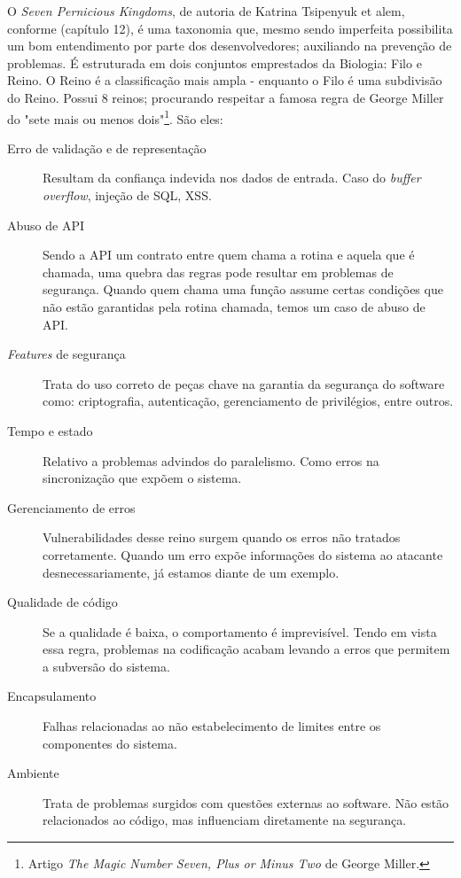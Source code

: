 			
			O \textsl{Seven Pernicious Kingdoms}, de autoria de Katrina Tsipenyuk et alem, conforme
			\cite{McGraw2006}(capítulo 12), é uma taxonomia que, mesmo sendo imperfeita possibilita
			um bom entendimento por parte dos desenvolvedores; auxiliando na prevenção de problemas.
			É estruturada em dois conjuntos emprestados da Biologia: Filo e Reino.
			O Reino é a classificação mais ampla - enquanto o Filo é uma subdivisão do Reino.
			Possui 8 reinos; procurando respeitar a famosa regra de George Miller 
			do "sete mais ou menos dois"\footnote{Artigo 
			\textsl{The Magic Number Seven, Plus or Minus Two} de George Miller.}. São eles:
			\begin{description}
				\item[Erro de validação e de representação]{Resultam da confiança
					indevida nos dados de entrada. Caso do \textsl{buffer overflow},
					injeção de SQL, XSS.}
				\item[Abuso de API]{Sendo a API um contrato entre quem chama a rotina
					e aquela que é chamada, uma quebra das regras pode resultar em problemas de segurança.
					Quando quem chama uma função assume certas condições que não estão garantidas
					pela rotina chamada, temos um caso de abuso de API.}
				\item[\textsl{Features} de segurança]{Trata do uso correto de peças chave na
					garantia da segurança do software como: criptografia, autenticação, gerenciamento
					de privilégios, entre outros.}
				\item[Tempo e estado]{Relativo a problemas advindos do paralelismo. Como erros
					na sincronização que expõem o sistema.}
				\item[Gerenciamento de erros]{Vulnerabilidades desse reino surgem quando
					os erros não tratados corretamente. Quando um erro expõe informações
					do sistema ao atacante desnecessariamente, já estamos diante de um exemplo.}
				\item[Qualidade de código]{Se a qualidade é baixa, o comportamento é imprevisível.
					Tendo em vista essa regra, problemas na codificação acabam levando
					a erros que permitem a subversão do sistema.}
				\item[Encapsulamento]{Falhas relacionadas ao não estabelecimento de limites entre os 
					componentes do sistema.}
				\item[Ambiente]{Trata de problemas surgidos com questões externas ao software.
					Não estão relacionados ao código, mas influenciam diretamente na segurança.}
			\end{description}
			
